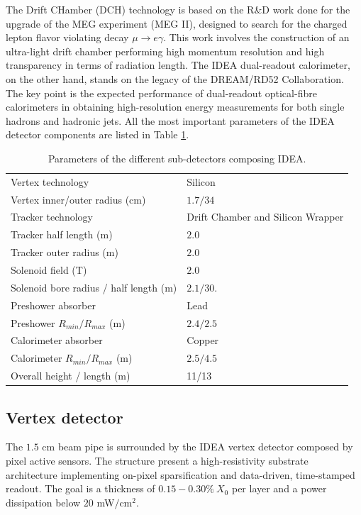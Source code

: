 The Drift CHamber (DCH) technology is based on the R\&D work done for the upgrade of the MEG experiment (MEG II), designed to search for the charged lepton flavor violating decay $\mu \rightarrow e\gamma$. This work involves the construction of an ultra-light drift chamber performing high momentum resolution and high transparency in terms of radiation length.
The IDEA dual-readout calorimeter, on the other hand, stands on the legacy of the DREAM/RD52 Collaboration. The key point is the expected performance of dual-readout optical-fibre calorimeters in obtaining high-resolution energy measurements for both single hadrons and hadronic jets.
All the most important parameters of the IDEA detector components are listed in Table \ref{tab:IDEA_part}.\\
\begin{table}
  \centering
  \begin{tabular}{ll}
    \toprule
    Vertex technology                       & Silicon \\
    Vertex inner/outer radius (cm)          & $1.7/34$ \\
    \midrule
    Tracker technology                      & Drift Chamber and Silicon Wrapper\\
    Tracker half length (m)                 & $2.0$ \\
    Tracker outer radius (m)                & $2.0$ \\
    \midrule
    Solenoid field (T)                      & $2.0$ \\
    Solenoid bore radius / half length (m)  & $2.1/30.$ \\
    \midrule
    Preshower absorber                      & Lead \\
    Preshower $R_{min}/R_{max}$ (m)         & $2.4/2.5$ \\
    \midrule
    Calorimeter absorber                    & Copper \\
    Calorimeter $R_{min}/R_{max}$ (m)       & $2.5/4.5$ \\
    \midrule
    Overall height / length (m)             & 11/13 \\
    \bottomrule
  \end{tabular}
  \caption{Parameters of the different sub-detectors composing IDEA.}
  \label{tab:IDEA_part}
\end{table}

\subsection{Vertex detector}
The $1.5$ cm beam pipe is surrounded by the IDEA vertex detector composed by pixel active sensors. The structure present a high-resistivity substrate architecture implementing on-pixel sparsification and data-driven, time-stamped readout.
The goal is a thickness of $0.15-0.30\%\ X_0$ per layer and a power dissipation below $20$ mW$/$cm$^2$.

